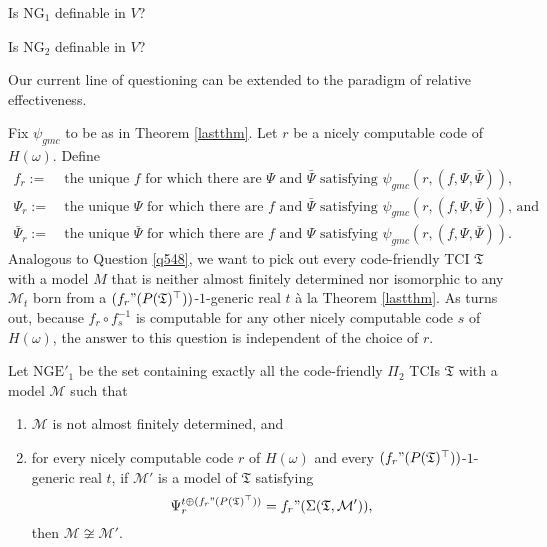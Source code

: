 \documentclass[12pt]{article}
\numberwithin{equation}{section}
\begin{document}
\begin{ques}\label{q548}
Is $\mathrm{NG}_1$ definable in $V$?
\end{ques}

\begin{ques}\label{q552}
Is $\mathrm{NG}_2$ definable in $V$?
\end{ques}

Our current line of questioning can be extended to the paradigm of relative effectiveness.

Fix $\psi_{gmc}$ to be as in Theorem \ref{lastthm}. Let $r$ be a nicely computable code of $H(\omega)$. Define
\begin{align*}
    f_r := \ & \text{the unique } f \text{ for which there are } \Psi \text{ and } \bar{\Psi} \text{ satisfying } \psi_{gmc}(r, (f, \Psi, \bar{\Psi})) \text{,} \\
    \Psi_r := \ & \text{the unique } \Psi \text{ for which there are } f \text{ and } \bar{\Psi} \text{ satisfying } \psi_{gmc}(r, (f, \Psi, \bar{\Psi})) \text{, and} \\
    \bar{\Psi}_r := \ & \text{the unique } \bar{\Psi} \text{ for which there are } f \text{ and } \Psi \text{ satisfying } \psi_{gmc}(r, (f, \Psi, \bar{\Psi})) \text{.}
\end{align*}
Analogous to Question \ref{q548}, we want to pick out every code-friendly TCI $\mathfrak{T}$ with a model $M$ that is neither almost finitely determined nor isomorphic to any $\mathcal{M}_t$ born from a $(f_r" (P(\mathfrak{T})^{\top}))$-$1$-generic real $t$ \`{a} la Theorem \ref{lastthm}. As turns out, because $f_r \circ f_s^{-1}$ is computable for any other nicely computable code $s$ of $H(\omega)$, the answer to this question is independent of
the choice of $r$.

\begin{defi}
Let $\mathrm{NGE}'_1$ be the set containing exactly all the code-friendly $\Pi_2$ TCIs $\mathfrak{T}$ with a model $\mathcal{M}$ such that
\begin{enumerate}[label=(\alph*)]
    \item $\mathcal{M}$ is not almost finitely determined, and
    \item for every nicely computable code $r$ of $H(\omega)$ and every $(f_r" (P(\mathfrak{T})^{\top}))$-$1$-generic real $t$, if $\mathcal{M}'$ is a model of $\mathfrak{T}$ satisfying 
    \begin{equation*}
        \Psi_r^{t \oplus (f_r" (P(\mathfrak{T})^{\top}))} = f_r" (\Sigma(\mathfrak{T}, \mathcal{M}')) \text{,}
    \end{equation*}
    then $\mathcal{M} \not \cong \mathcal{M}'$.
\end{enumerate}
\end{defi}
\end{document}
